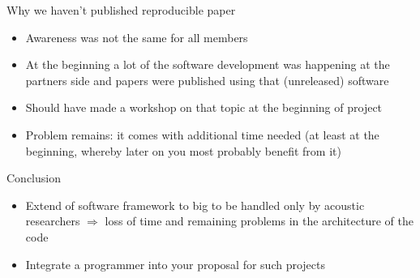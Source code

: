 \documentclass{beamer}
\begin{document}
\begin{frame}{Why we haven't published reproducible paper}

    \begin{itemize}
        \item Awareness was not the same for all members
        \item At the beginning a lot of the software development was happening
            at the partners side and papers were published using that
            (unreleased) software
        \item Should have made a workshop on that topic at the beginning of
            project
        \item Problem remains: it comes with additional time needed (at least at
            the beginning, whereby later on you most probably benefit from it)
    \end{itemize}

\end{frame}

\begin{frame}{Conclusion}

    \begin{itemize}
        \item Extend of software framework to big to be handled only by acoustic
            researchers $\Rightarrow$ loss of time and remaining problems in the
            architecture of the code
        \item Integrate a programmer into your proposal for such projects
    \end{itemize}

\end{frame}
\end{document}
